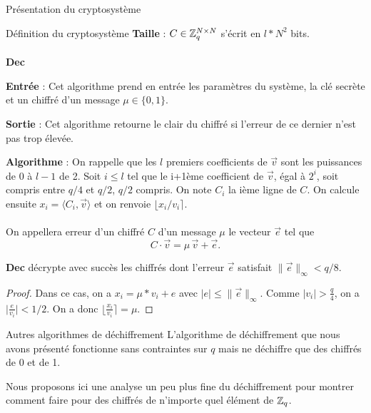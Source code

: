 \begin{section}{Présentation du cryptosystème}
\begin{subsection}{Définition du cryptosystème}
	\textbf{Taille} : $C \in \mathbb{Z}_q^{N \times N}$ s'écrit en $l * N^2$ bits.
	
	\paragraph{}
	\textbf{Dec}
	\flushleft
	
	\textbf{Entrée} : Cet algorithme prend en entrée les paramètres du système, la clé secrète et un chiffré d'un message $\mu \in \{ 0,1\} $.

	\textbf{Sortie} : Cet algorithme retourne le clair du chiffré si l'erreur de ce dernier n'est pas trop élevée.

	\textbf{Algorithme} : On rappelle que les $l$ premiers coefficients de $\vec{v}$ sont les puissances de 0 à $l-1$ de 2. Soit $i \leqslant l$ tel que le i+1ème coefficient de $\vec{v}$, égal à $2^{i}$, soit compris entre $q/4$ et $q/2$, $q/2$ compris. On note $C_i$ la ième ligne de $C$. On calcule ensuite $x_i = \langle C_i, \vec{v} \rangle$ et on renvoie $\lfloor x_i/v_i \rceil$.


\paragraph{}
\begin{definition}
On appellera erreur d'un chiffré $C$ d'un message $\mu$ le vecteur $\vec{e}$ tel que
\[ C\cdot \vec{v} = \mu\, \vec{v} + \vec{e}. \]
\end{definition}

\begin{prop}
\label{dec}
\textbf{Dec} décrypte avec succès les chiffrés dont l'erreur $\vec{e}$ satisfait $\|\vec{e}\|_\infty < q/8$.
\end{prop}
\begin{proof}
	Dans ce cas, on a $x_i = \mu * v_i + e$ avec $\lvert e \lvert \leqslant \|\vec{e}\|_\infty$. Comme $\lvert v_i \lvert > \frac{q}{4}$, on a $\lvert \frac{e}{v_i} \lvert < 1/2$. On a donc $\lfloor \frac{x_i}{v_i} \rceil = \mu$.
\end{proof}
	\end{subsection}
	
\begin{subsection}{Autres algorithmes de déchiffrement}
	L'algorithme de déchiffrement que nous avons présenté fonctionne sans contraintes sur $q$ mais ne déchiffre que des chiffrés de 0 et de 1.

	Nous proposons ici une analyse un peu plus fine du déchiffrement pour montrer comment faire pour des chiffrés de n'importe quel élément de $\mathbb{Z}_q$.


\end{subsection}
\end{section}

